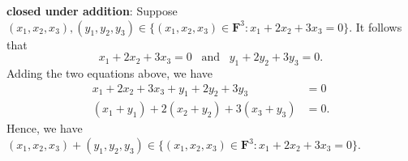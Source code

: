 \documentclass{article}
\begin{document}
\textbf{closed under addition}: Suppose\newline $(x_1,x_2,x_3),(y_1,y_2,y_3)\in\{(x_1,x_2,x_3)\in\mathbf{F}^3:x_1+2x_2+3x_3=0\}$. 
It follows that 
\[x_1+2x_2+3x_3=0\;\;\;\text{and}\;\;\;y_1+2y_2+3y_3=0.\]
Adding the two equations above, we have
\begin{align*}
    x_1+2x_2+3x_3+y_1+2y_2+3y_3&=0\\
    (x_1+y_1)+2(x_2+y_2)+3(x_3+y_3)&=0.
\end{align*}
Hence, we have\newline $(x_1,x_2,x_3)+(y_1,y_2,y_3)\in\{(x_1,x_2,x_3)\in\mathbf{F}^3:x_1+2x_2+3x_3=0\}$.
\end{document}
